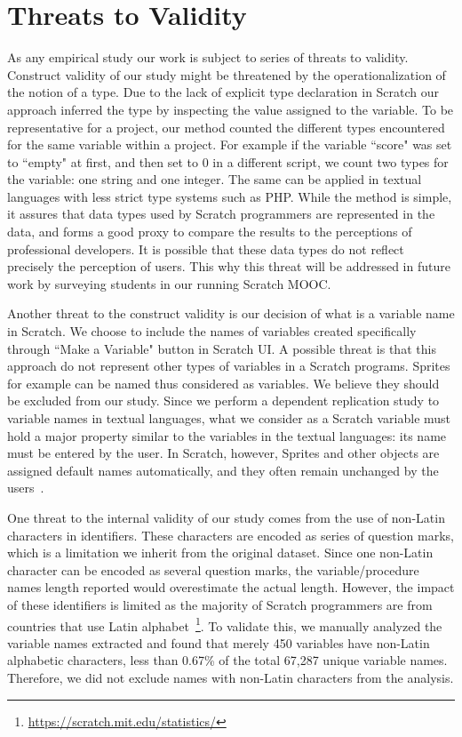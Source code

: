 \documentclass[conference]{IEEEtran}
\begin{document}
\section{Threats to Validity}
As any empirical study our work is subject to series of threats to validity.
Construct validity of our study might be threatened by the operationalization of the notion of a type. 
Due to the lack of explicit type declaration in Scratch our approach inferred the type by inspecting the value assigned to the variable. To be representative for a project, our method counted the different types encountered for the same variable within a project. For example if the variable ``score" was set to ``empty" at first, and then set to 0 in a different script, we count two types for the variable: one string and one integer. The same can be applied in textual languages with less strict type systems such as PHP. While the method is simple, it assures that data types used by Scratch programmers are represented in the data, and forms a good proxy to compare the results to the perceptions of professional developers. It is possible that these data types do not reflect precisely the perception of users. This why this threat will be addressed in future work by surveying students in our running Scratch MOOC.

Another threat to the construct validity is our decision of what is a variable name in Scratch. We choose to include the names of variables created specifically through ``Make a Variable" button in Scratch UI. A possible threat is that this approach do not represent other types of variables in a Scratch programs. Sprites for example can be named thus considered as variables. We believe they should be excluded from our study. Since we perform a dependent replication study to variable names in textual languages, what we consider as a Scratch variable must hold a major property similar to the variables in the textual languages: its name must be entered by the user. In Scratch, however, Sprites and other objects are assigned default names automatically, and they often remain unchanged by the users~\cite{MoreonoRobles}.

One threat to the internal validity of our study comes from the use of non-Latin characters in identifiers. These characters are encoded as series of question marks, which is a limitation we inherit from the original dataset. Since one non-Latin character can be encoded as several question marks, the variable/procedure names length reported would overestimate the actual length. However, the impact of these identifiers is limited as the majority of Scratch programmers are from countries that use Latin alphabet~\footnote{\url{https://scratch.mit.edu/statistics/}}. To validate this, we manually analyzed the variable names extracted and found that merely 450 variables have non-Latin alphabetic characters, less than 0.67\% of the total 67,287 unique variable names. Therefore, we did not exclude names with non-Latin characters from the analysis.
\end{document}
